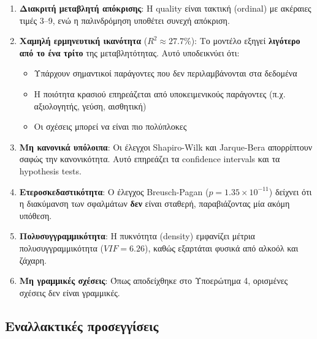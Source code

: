\documentclass[12pt,a4paper]{article}
\begin{document}
\begin{enumerate}[label=\textbf{\arabic*.}]
    \item \textbf{Διακριτή μεταβλητή απόκρισης}: Η quality είναι τακτική (ordinal) με ακέραιες τιμές 3--9, ενώ η παλινδρόμηση υποθέτει συνεχή απόκριση.

    \item \textbf{Χαμηλή ερμηνευτική ικανότητα} ($R^2 \approx 27.7\%$): Το μοντέλο εξηγεί \textbf{λιγότερο από το ένα τρίτο} της μεταβλητότητας. Αυτό υποδεικνύει ότι:
    \begin{itemize}
        \item Υπάρχουν σημαντικοί παράγοντες που δεν περιλαμβάνονται στα δεδομένα
        \item Η ποιότητα κρασιού επηρεάζεται από υποκειμενικούς παράγοντες (π.χ. αξιολογητής, γεύση, αισθητική)
        \item Οι σχέσεις μπορεί να είναι πιο πολύπλοκες
    \end{itemize}

    \item \textbf{Μη κανονικά υπόλοιπα}: Οι έλεγχοι Shapiro-Wilk και Jarque-Bera απορρίπτουν σαφώς την κανονικότητα. Αυτό επηρεάζει τα confidence intervals και τα hypothesis tests.

    \item \textbf{Ετεροσκεδαστικότητα}: Ο έλεγχος Breusch-Pagan ($p = 1.35 \times 10^{-11}$) δείχνει ότι η διακύμανση των σφαλμάτων \textbf{δεν} είναι σταθερή, παραβιάζοντας μία ακόμη υπόθεση.

    \item \textbf{Πολυσυγγραμμικότητα}: Η πυκνότητα (density) εμφανίζει μέτρια πολυσυγγραμμικότητα ($VIF = 6.26$), καθώς εξαρτάται φυσικά από αλκοόλ και ζάχαρη.

    \item \textbf{Μη γραμμικές σχέσεις}: Όπως αποδείχθηκε στο Υποερώτημα 4, ορισμένες σχέσεις δεν είναι γραμμικές.
\end{enumerate}

\subsection{Εναλλακτικές προσεγγίσεις}
\end{document}
